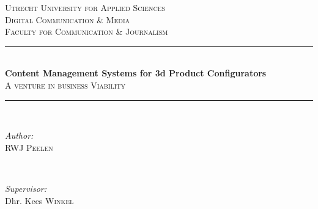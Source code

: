 \begin{titlepage}

\newcommand{\HRule}{\rule{\linewidth}{0.5mm}} %

\center %
 

\textsc{\Large Utrecht University for Applied Sciences}\\[1cm]
\textsc{\Large Digital Communication \& Media}\\[0.5cm]
\textsc{\large Faculty for Communication \& Journalism}\\[0.5cm]


\HRule \\[0.4cm]
{ \huge \bfseries Content Management Systems for 3d Product Configurators}\\[0.4cm]
\textsc{\large A venture in business Viability}\\[0.5cm]
\HRule \\[1.5cm]
 

\begin{minipage}{0.4\textwidth}
\begin{flushleft} \large
\emph{Author:}\\
RWJ \textsc{Peelen} %
\end{flushleft}
\end{minipage}
~
\begin{minipage}{0.4\textwidth}
\begin{flushright} \large
\emph{Supervisor:} \\
Dhr. Kees \textsc{Winkel} %
\end{flushright}
\end{minipage}\\[2cm]



\end{titlepage}
